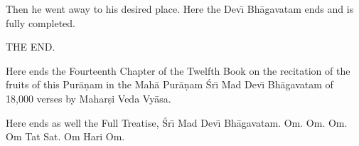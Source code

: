 Then he went away to his desired place. Here the Dev\={\i} Bh\=agavatam ends and is fully completed.

THE END.

Here ends the Fourteenth Chapter of the Twelfth Book on the recitation of the fruits of this Pur\=a\d{n}am in the Mah\=a Pur\=a\d{n}am \'Sr\={\i} Mad Dev\={\i} Bh\=agavatam of 18,000 verses by Mahar\d{s}i Veda Vy\=asa.

Here ends as well the Full Treatise, \'Sr\={\i} Mad Dev\={\i} Bh\=agavatam.
Om. Om. Om. Om Tat Sat. Om Hari Om.

